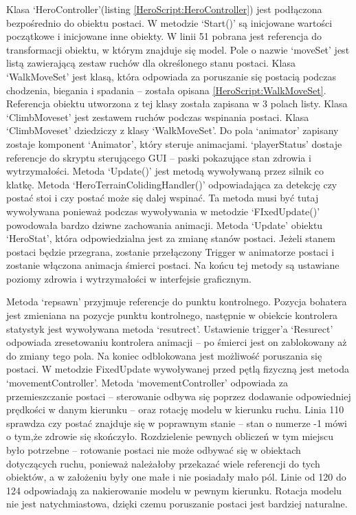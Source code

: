 \documentclass[12pt,twoside]{article}
\begin{document}
Klasa `HeroController'(listing \ref{HeroScript:HeroController}) jest podłączona
bezpośrednio do obiektu postaci. W metodzie `Start()' są inicjowane wartości
początkowe i inicjowane inne obiekty. W linii 51 pobrana jest referencja do
transformacji obiektu, w którym znajduje się model. Pole o nazwie `moveSet' jest
listą zawierającą zestaw ruchów dla określonego stanu postaci. Klasa
`WalkMoveSet' jest klasą, która odpowiada za poruszanie się postacią podczas
chodzenia, biegania i spadania -- została opisana
\ref{HeroScript:WalkMoveSet}. Referencja obiektu utworzona z tej klasy
została zapisana w 3 polach listy. Klasa `ClimbMoveset' jest zestawem ruchów
podczas wspinania postaci. Klasa `ClimbMoveset' dziedziczy z klasy
`WalkMoveSet'. Do pola `animator' zapisany zostaje komponent `Animator', który
steruje animacjami. `playerStatus' dostaje referencje do skryptu sterującego GUI
– paski pokazujące stan zdrowia i wytrzymałości. Metoda `Update()' jest metodą
wywoływaną przez silnik co klatkę. Metoda `HeroTerrainColidingHandler()'
odpowiadająca za detekcję czy postać stoi i czy postać może się dalej wspinać.
Ta metoda musi być tutaj wywoływana ponieważ podczas wywoływania w metodzie
`FIxedUpdate()' powodowała bardzo dziwne zachowania animacji. Metoda `Update'
obiektu `HeroStat', która odpowiedzialna jest za zmianę stanów postaci. Jeżeli
stanem postaci będzie przegrana, zostanie przełączony Trigger w animatorze
postaci i zostanie włączona animacja śmierci postaci. Na końcu tej metody są
ustawiane poziomy zdrowia i wytrzymałości w interfejsie graficznym. 

Metoda `repsawn' przyjmuje referencje do punktu kontrolnego. Pozycja bohatera
jest zmieniana na pozycje punktu kontrolnego, następnie w obiekcie kontrolera
statystyk jest wywoływana metoda `resutrect'. Ustawienie trigger’a `Resurect'
odpowiada zresetowaniu kontrolera animacji -- po śmierci jest on zablokowany aż
do zmiany tego pola. Na koniec odblokowana jest możliwość poruszania się
postaci. W metodzie FixedUpdate wywoływanej przed pętlą fizyczną jest metoda
`movementController'. Metoda `movementController' odpowiada za przemieszczanie
postaci -- sterowanie odbywa się poprzez dodawanie odpowiedniej prędkości w danym
kierunku -- oraz rotację modelu w kierunku ruchu. Linia 110 sprawdza czy postać
znajduje się w poprawnym stanie -- stan o numerze -1 mówi o tym,że zdrowie się
skończyło. Rozdzielenie pewnych obliczeń w tym miejscu było potrzebne –
rotowanie postaci nie może odbywać się w obiektach dotyczących ruchu, ponieważ
należałoby przekazać wiele referencji do tych obiektów, a w założeniu były one
małe i nie posiadały mało pól. Linie od 120 do 124 odpowiadają za nakierowanie
modelu w pewnym kierunku. Rotacja modelu nie jest natychmiastowa, dzięki czemu
poruszanie postaci jest bardziej naturalne.
\end{document}
